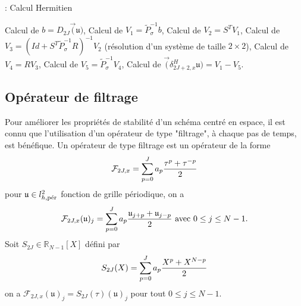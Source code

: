 \begin{center}
\begin{minipage}[H]{12cm}
  \begin{algorithm}[H]
    \caption{: Calcul Hermitien}\label{alg:SH}
    \begin{algorithmic}[1]
    \State Calcul de $b = D_{2J} \vec (\mathfrak{u})$,
	\State Calcul de $V_1 = \tilde{P}_{\sigma}^{-1} b$,
	\State Calcul de $V_2 = S^T V_1$,
	\State Calcul de $V_3 = (Id + S^T \tilde{P}_{\sigma}^{-1}R)^{-1} V_2$ (résolution d'un système de taille $2 \times 2$),
	\State Calcul de $V_4 = R V_3$,
	\State Calcul de $V_5 = \tilde{P}_{\sigma}^{-1} V_4$,
	\State Calcul de $\vec (\delta_{2J+2,x}^H \mathfrak{u}) = V_1 - V_5$.
    \end{algorithmic}
    \end{algorithm}
\end{minipage}
\end{center}

























\subsection{Opérateur de filtrage}


Pour améliorer les propriétés de stabilité d'un schéma centré en espace, il est connu que l'utilisation d'un opérateur de type "filtrage", à chaque pas de temps, est bénéfique. Un opérateur de type filtrage est un opérateur de la forme
\begin{equation}
\mathcal{F}_{2J,x} = \gsum_{p=0}^J a_p \dfrac{\tau^p + \tau^{-p}}{2}
\label{eq:ftr}
\end{equation}
pour $\mathfrak{u} \in l^2_{h,\per}$ fonction de grille périodique, on a
\begin{equation}
\mathcal{F}_{2J,x} (\mathfrak{u} )_j = \gsum_{p=0}^J a_p \dfrac{\mathfrak{u}_{j+p} + \mathfrak{u}_{j-p}}{2} \text{ avec } 0  \leq j \leq N-1.
\end{equation}
Soit $S_{2J} \in \mathbb{R}_{N-1}[X]$ défini par 
\begin{equation}
S_{2J}(X) = \gsum_{p=0}^J a_p \dfrac{X^p + X^{N-p}}{2}
\label{eq:pol_filtrage}
\end{equation}
on a $\mathcal{F}_{2J,x}(\mathfrak{u})_j = S_{2J}(\tau)(\mathfrak{u})_j$ pour tout $0 \leq j \leq N-1$.

